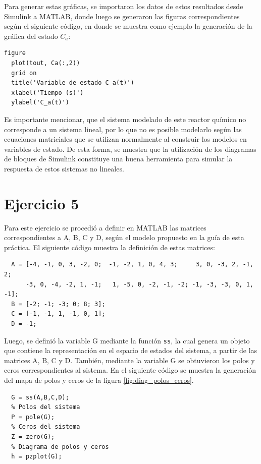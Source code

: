 \documentclass[12pt,letterpaper]{article}
\begin{document}
Para generar estas gráficas, se importaron los datos de estos resultados desde Simulink a MATLAB,
donde luego se generaron las figuras correspondientes según el siguiente código, en donde se muestra
como ejemplo la generación de la gráfica del estado $C_a$:


\begin{lstlisting}[style=Matlab-editor, basicstyle=\mlttfamily]
  figure
  plot(tout, Ca(:,2))
  grid on
  title('Variable de estado C_a(t)')
  xlabel('Tiempo (s)')
  ylabel('C_a(t)')
\end{lstlisting}

Es importante mencionar, que el sistema modelado de este reactor químico no corresponde a un sistema
lineal, por lo que no es posible modelarlo según las ecuaciones matriciales que se utilizan
normalmente al construir los modelos en variables de estado. De esta forma, se muestra que la
utilización de los diagramas de bloques de Simulink constituye una buena herramienta para simular la
respuesta de estos sistemas no lineales.

\section{Ejercicio 5}

Para este ejercicio se procedió a definir en MATLAB las matrices correspondientes a A, B, C y D,
según el modelo propuesto en la guía de esta práctica. El siguiente código muestra la definición de
estas matrices:

\begin{lstlisting}[style=Matlab-editor, basicstyle=\mlttfamily]
  % Matrices del MVE del sistema
  A = [-4, -1, 0, 3, -2, 0;  -1, -2, 1, 0, 4, 3;     3, 0, -3, 2, -1, 2; 
      -3, 0, -4, -2, 1, -1;   1, -5, 0, -2, -1, -2; -1, -3, -3, 0, 1, -1];
  B = [-2; -1; -3; 0; 8; 3];
  C = [-1, -1, 1, -1, 0, 1];
  D = -1;
\end{lstlisting}


Luego, se definió la variable G mediante la función \texttt{ss}, la cual genera un objeto que
contiene la representación en el espacio de estados del sistema, a partir de las matrices A, B, C y
D. También, mediante la variable G se obtuvieron los polos y ceros correspondientes al
sistema. En el siguiente código se muestra la generación del mapa de polos y ceros de la 
figura \ref{fig:diag_polos_ceros}.

\begin{lstlisting}[style=Matlab-editor, basicstyle=\mlttfamily]
  % Representacion en el espacio de estados del sistema
  G = ss(A,B,C,D);
  % Polos del sistema
  P = pole(G);
  % Ceros del sistema
  Z = zero(G);
  % Diagrama de polos y ceros
  h = pzplot(G); 

\end{lstlisting}
\end{document}
